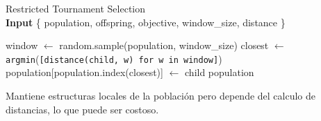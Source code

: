 \begin{algorithm}[H]
	\caption{Restricted Tournament Selection \\ \textbf{Input} \{ population, offspring, objective, window\_size, distance \}}
	\begin{algorithmic}[1]
		\State window $\gets$ random.sample(population, window\_size)
		\State closest $\gets$ \texttt{argmin}(\texttt{[distance(child, w) for w in window]})
		\State population[population.index(closest)] $\gets$ child
		\EndIf
		\EndFor
		\State \Return population
		\EndFunction
	\end{algorithmic}
	\label{alg:replacement_rts}
\end{algorithm}

Mantiene estructuras locales de la población pero depende del calculo de distancias, lo que puede ser costoso.